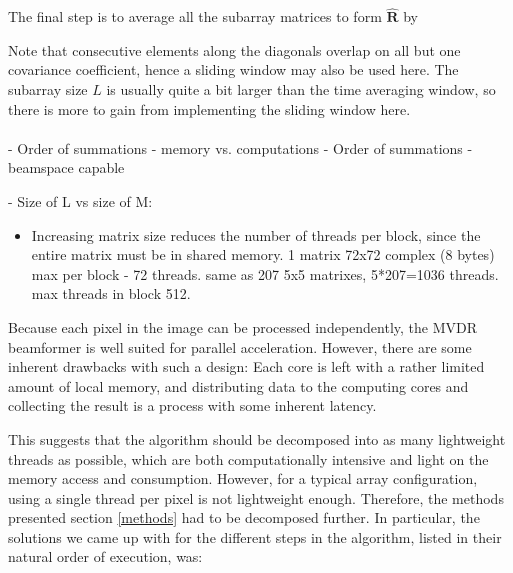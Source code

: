 \documentclass[12pt,journal,captionsoff,onecolumn]{IEEEtran}
\newcommand\mat[1]{\boldsymbol{#1}}
\newcommand\1{\vec 1}
\begin{document}
The final step is to average all the subarray matrices to form $\hat{\mat R}$ by 

Note that consecutive elements along the diagonals overlap on all but one covariance coefficient, hence a sliding window may also be used here. The subarray size $L$ is usually quite a bit larger than the time averaging window, so there is more to gain from implementing the sliding window here.\\\\



- Order of summations - memory vs. computations
- Order of summations - beamspace capable

- Size of L vs size of M:

\begin{itemize}
\item Increasing matrix size reduces the number of threads per block, since the entire matrix must be in shared memory. 1 matrix 72x72 complex (8 bytes) max per block - 72 threads. same as 207 5x5 matrixes, 5*207=1036 threads. max threads in block 512.
\end{itemize}

Because each pixel in the image can be processed independently, the \gls{MVDR} beamformer is well suited for parallel acceleration. However, there are some inherent drawbacks with such a design: Each core is left with a rather limited amount of local memory, and distributing data to the computing cores and collecting the result is a process with some inherent latency.

This suggests that the algorithm should be decomposed into as many lightweight threads as possible, which are both computationally intensive and light on the memory access and consumption. However, for a typical array configuration, using a single thread per pixel is not lightweight enough. Therefore, the methods presented section \ref{methods} had to be decomposed further. In particular, the solutions we came up with for the different steps in the algorithm, listed in their natural order of execution, was:
\end{document}
